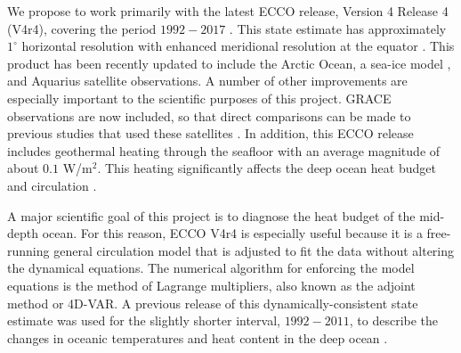 \documentclass[authoryear,round,12pt]{article}
\begin{document}
We propose to work primarily with the latest ECCO release, Version 4
Release 4 (V4r4), covering the period $1992-2017$ \citep[following the
manual,][]{ECCOConsort--2019:ECCO}. This state estimate has
approximately $1^{\circ}$ horizontal resolution with enhanced meridional resolution at the equator \citep{Forget-Campin-2015:ECCO,Fukumori-Wang-2017:ECCO}. This product has been recently updated to include the Arctic Ocean, a sea-ice model \citep{Fenty-Heimbach-2013:Coupled}, and Aquarius satellite observations. A number of other improvements are especially important to the scientific purposes of this project. GRACE observations are now included, so that direct comparisons can be made to previous studies that used these satellites \citep[e.g.,][]{Llovel-Willis-2014:Deep}. In addition, this ECCO release includes geothermal heating through the seafloor with an average magnitude of about $0.1$ W/m$^2$. This heating significantly affects the deep ocean heat budget and circulation \citep[e.g.,][]{Piecuch-Heimbach-2015:Sensitivity}.



A major scientific goal of this project is to diagnose the heat budget of the mid-depth ocean. For this reason, ECCO V4r4 is especially useful because it is a free-running general circulation model that is adjusted to fit the data without altering the dynamical equations. The numerical algorithm for enforcing the model equations is the method of Lagrange multipliers, also known as the adjoint method or 4D-VAR. A previous release of this dynamically-consistent state estimate was used for the slightly shorter interval, $1992-2011$, to describe the changes in oceanic temperatures and heat content in the deep ocean \citep{Wunsch-Heimbach-2014:Bidecadal} . 
\end{document}
